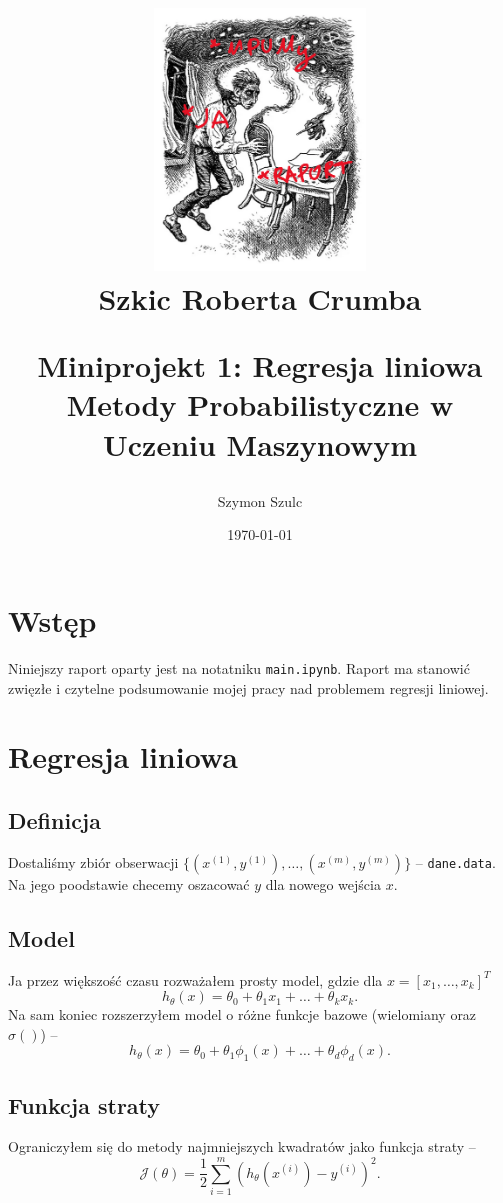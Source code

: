 \documentclass[a4paper,12pt]{article}
\title{
    \vspace{2cm} %
    \begin{figure}[h!]
        \centering
        \includegraphics[width=0.5\textwidth]{kafka2.png}
        \caption{Szkic Roberta Crumba}
        \label{fig:kafka}
    \end{figure}
    \vspace{1cm} %
    \textbf{\Huge Miniprojekt 1: Regresja liniowa} \\
    \vspace{1cm} %
    \large Metody Probabilistyczne w Uczeniu Maszynowym \\
    \vspace{0.5cm} %
    \large \date{\today}
}
\author{Szymon Szulc}
\begin{document}
\maketitle
\thispagestyle{empty}
\newpage

\setcounter{page}{1}  %
\tableofcontents
\newpage

\section{Wstęp}
Niniejszy raport oparty jest na notatniku \texttt{main.ipynb}. Raport ma stanowić zwięzłe i czytelne podsumowanie mojej pracy nad problemem regresji liniowej.

\section{Regresja liniowa}
\subsection{Definicja}
Dostaliśmy zbiór obserwacji \( \{(x^{(1)}, y^{(1)}), \dots, (x^{(m)}, y^{(m)}) \} \) -- \texttt{dane.data}. Na jego poodstawie checemy oszacować $y$ dla nowego wejścia $x$.

\subsection{Model}
Ja przez większość czasu rozważałem prosty model, gdzie dla \(x = [x_1,\dots, x_k]^T\)
\[ h_{\theta}(x) = \theta_0 + \theta_1 x_1 + \dots + \theta_k x_k .\]
Na sam koniec rozszerzyłem model o różne funkcje bazowe (wielomiany oraz $\sigma()$) --
\[ h_{\theta}(x) = \theta_0 + \theta_1 \phi_1(x) + \dots + \theta_d \phi_d(x) .\]

\subsection{Funkcja straty}
Ograniczyłem się do metody najmniejszych kwadratów jako funkcja straty --
\[ \mathcal{J}(\theta) = \frac{1}{2} \sum_{i=1}^{m}{(h_{\theta}(x^{(i)}) - y^{(i)})^2} .\]

\newpage
\end{document}
